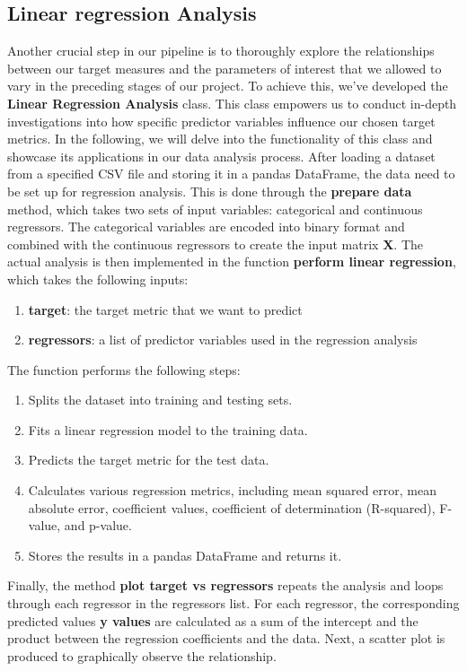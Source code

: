 \subsection{Linear regression Analysis}
Another crucial step in our pipeline is to thoroughly explore the relationships between our target measures and the parameters of interest that we allowed to vary in the preceding stages of our project. To achieve this, we've developed the \textbf{Linear Regression Analysis} class. This class empowers us to conduct in-depth investigations into how specific predictor variables influence our chosen target metrics. In the following, we will delve into the functionality of this class and showcase its applications in our data analysis process.
After loading a dataset from a specified CSV file and storing it in a pandas DataFrame, the data need to be set up for regression analysis. This is done through the \textbf{prepare data} method, which takes two sets of input variables: categorical and continuous regressors. The categorical variables are encoded into binary format and combined with the continuous regressors to create the input matrix \textbf{X}.
The actual analysis is then implemented in the function \textbf{perform linear regression}, which takes the following inputs: 
\begin{enumerate}[label=$\bullet$]
\item \textbf{target}: the target metric that we want to predict
\item \textbf{regressors}: a list of predictor variables used in the regression analysis 
\end{enumerate}
The function performs the following steps: 
\begin{enumerate}[label=$\bullet$]
\item Splits the dataset into training and testing sets.
\item Fits a linear regression model to the training data.
\item Predicts the target metric for the test data.
\item Calculates various regression metrics, including mean squared error, mean absolute error, coefficient values, coefficient of determination (R-squared), F-value, and p-value.
\item Stores the results in a pandas DataFrame and returns it.
\end{enumerate}

Finally, the method \textbf{plot target vs regressors} repeats the analysis and loops through each regressor in the regressors list. For each regressor, the corresponding predicted values \textbf{y values} are calculated as a sum of the intercept and the product between the regression coefficients and the data. Next, a scatter plot is produced to graphically observe the relationship.


